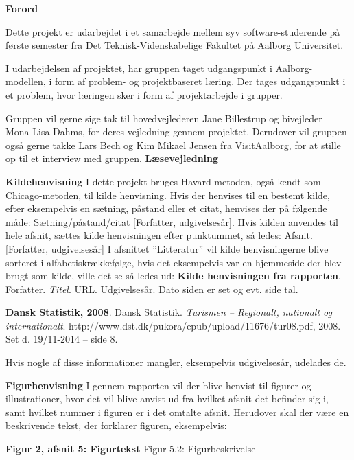 {\Huge\textbf{Forord}}

Dette projekt er udarbejdet i et samarbejde mellem syv software-studerende på første semester fra Det Teknisk-Videnskabelige Fakultet på Aalborg Universitet. 

I udarbejdelsen af projektet, har gruppen taget udgangspunkt i Aalborg-modellen, i form af problem- og projektbaseret læring. Der tages udgangspunkt i et problem, hvor læringen sker i form af projektarbejde i grupper.

Gruppen vil gerne sige tak til hovedvejlederen Jane Billestrup og bivejleder Mona-Lisa Dahms, for deres vejledning gennem projektet. Derudover vil gruppen også gerne takke Lars Bech og Kim Mikael Jensen fra VisitAalborg, for at stille op til et interview med gruppen. \newline
\newline
\newline
{\Huge\textbf{Læsevejledning}}

{\Large\textbf{Kildehenvisning}}\newline
I dette projekt bruges Havard-metoden, også kendt som Chicago-metoden, til kilde henvisning. Hvis der henvises til en bestemt kilde, efter eksempelvis en sætning, påstand eller et citat, henvises der på følgende måde: Sætning/påstand/citat [Forfatter, udgivelsesår].\newline
Hvis kilden anvendes til hele afsnit, sættes kilde henvisningen efter punktummet, så ledes: Afsnit.[Forfatter, udgivelsesår]\newline
I afsnittet ”Litteratur” vil kilde henvisningerne blive sorteret i alfabetiskrækkefølge, hvis det eksempelvis var en hjemmeside der blev brugt som kilde, ville det se så ledes ud: \newline
\textbf{Kilde henvisningen fra rapporten}. Forfatter. \textit{Titel}. URL. Udgivelsesår. Dato siden er set og evt. side tal.

\textbf{Dansk Statistik, 2008}. Dansk Statistik. \textit{Turismen – Regionalt, nationalt og internationalt}. http://www.dst.dk/pukora/epub/upload/11676/tur08.pdf, 2008. Set d. 19/11-2014 – side 8.

Hvis nogle af disse informationer mangler, eksempelvis udgivelsesår, udelades de.

{\Large\textbf{Figurhenvisning}} \newline
I gennem rapporten vil der blive henvist til figurer og illustrationer, hvor det vil blive anvist ud fra hvilket afsnit det befinder sig i, samt hvilket nummer i figuren er i det omtalte afsnit. Herudover skal der være en beskrivende tekst, der forklarer figuren, eksempelvis:
\begin{flushleft}
{\LARGE\textbf{Figur 2, afsnit 5: Figurtekst}}\newline
Figur 5.2: Figurbeskrivelse
\end{flushleft}
